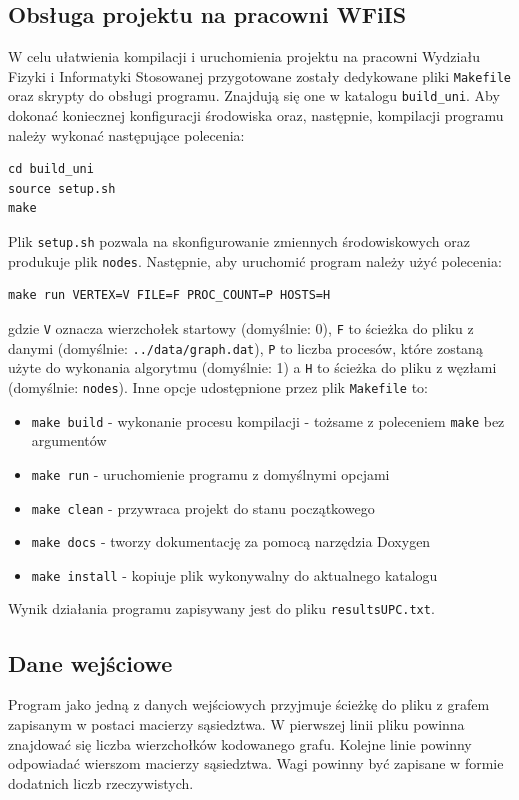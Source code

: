 \documentclass[12pt]{article}
\begin{document}
\subsection{Obsługa projektu na pracowni WFiIS}
W celu ułatwienia kompilacji i uruchomienia projektu na pracowni Wydziału Fizyki i Informatyki Stosowanej przygotowane zostały dedykowane pliki \lstinline{Makefile} oraz skrypty do obsługi programu. Znajdują się one w katalogu \lstinline{build_uni}. Aby dokonać koniecznej konfiguracji środowiska oraz, następnie, kompilacji programu należy wykonać następujące polecenia:
\begin{lstlisting}
cd build_uni
source setup.sh
make
\end{lstlisting}
Plik \lstinline{setup.sh} pozwala na skonfigurowanie zmiennych środowiskowych oraz produkuje plik \lstinline{nodes}. Następnie, aby uruchomić program należy użyć polecenia:
\begin{lstlisting}
make run VERTEX=V FILE=F PROC_COUNT=P HOSTS=H
\end{lstlisting}
gdzie \lstinline{V} oznacza wierzchołek startowy (domyślnie: 0), \lstinline{F} to ścieżka do pliku z danymi (domyślnie: \lstinline{../data/graph.dat}), \lstinline{P} to liczba procesów, które zostaną użyte do wykonania algorytmu (domyślnie: 1) a \lstinline{H} to ścieżka do pliku z węzłami (domyślnie: \lstinline{nodes}). Inne opcje udostępnione przez plik \lstinline{Makefile} to:
\begin{itemize}
\item \lstinline{make build} - wykonanie procesu kompilacji - tożsame z poleceniem \lstinline{make} bez argumentów
\item \lstinline{make run} - uruchomienie programu z domyślnymi opcjami
\item \lstinline{make clean} - przywraca projekt do stanu początkowego
\item \lstinline{make docs} - tworzy dokumentację za pomocą narzędzia Doxygen
\item \lstinline{make install} - kopiuje plik wykonywalny do aktualnego katalogu
\end{itemize}
Wynik działania programu zapisywany jest do pliku \lstinline{resultsUPC.txt}.

\subsection{Dane wejściowe}
Program jako jedną z danych wejściowych przyjmuje ścieżkę do pliku z grafem zapisanym w postaci macierzy sąsiedztwa. W pierwszej linii pliku powinna znajdować się liczba wierzchołków kodowanego grafu. Kolejne linie powinny odpowiadać wierszom macierzy sąsiedztwa. Wagi powinny być zapisane w formie dodatnich liczb rzeczywistych.
\end{document}
